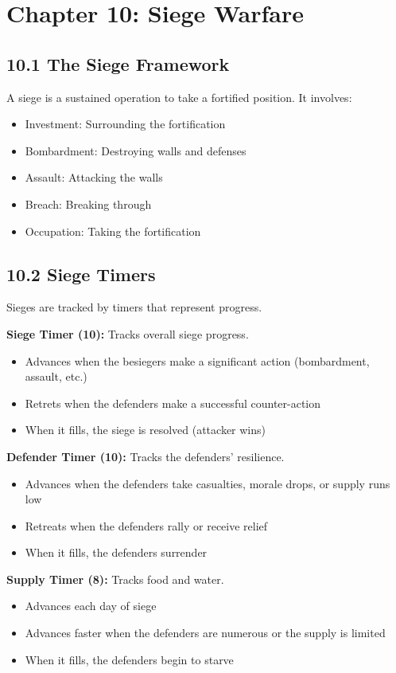 \documentclass[11pt]{article}
\begin{document}
\section{Chapter 10: Siege Warfare}

\subsection{10.1 The Siege Framework}

A siege is a sustained operation to take a fortified position. It involves:
\begin{itemize}
  \item Investment: Surrounding the fortification
  \item Bombardment: Destroying walls and defenses
  \item Assault: Attacking the walls
  \item Breach: Breaking through
  \item Occupation: Taking the fortification
\end{itemize}

\subsection{10.2 Siege Timers}

Sieges are tracked by timers that represent progress.

\textbf{Siege Timer (10):} Tracks overall siege progress.
\begin{itemize}
  \item Advances when the besiegers make a significant action (bombardment, assault, etc.)
  \item Retrets when the defenders make a successful counter-action
  \item When it fills, the siege is resolved (attacker wins)
\end{itemize}

\textbf{Defender Timer (10):} Tracks the defenders' resilience.
\begin{itemize}
  \item Advances when the defenders take casualties, morale drops, or supply runs low
  \item Retreats when the defenders rally or receive relief
  \item When it fills, the defenders surrender
\end{itemize}

\textbf{Supply Timer (8):} Tracks food and water.
\begin{itemize}
  \item Advances each day of siege
  \item Advances faster when the defenders are numerous or the supply is limited
  \item When it fills, the defenders begin to starve
\end{itemize}
\end{document}
